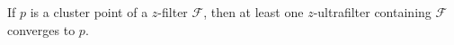 If $p$ is a cluster point of a $z$-filter $\mathcal{F}$, then at least one $z$-ultrafilter containing $\mathcal{F}$ converges to $p$.
